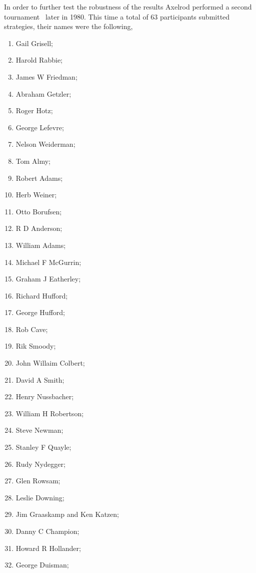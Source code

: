 \documentclass{article}
\theoremstyle{definition}
\begin{document}
In order to further test the robustness of the results Axelrod performed a second
tournament~\cite{Axelrod1980b} later in 1980. This time a total of 63 participants
submitted strategies, their names were the following,

\begin{multicols}{3}
    \begin{enumerate}
        \item Gail Grisell;
        \item Harold Rabbie;
        \item James W Friedman;
        \item Abraham Getzler;
        \item Roger Hotz;
        \item George Lefevre;
        \item Nelson Weiderman;
        \item Tom Almy;
        \item Robert Adams;
        \item Herb Weiner;
        \item Otto Borufsen;
        \item R D Anderson;
        \item William Adams;
        \item Michael F McGurrin;
        \item Graham J Eatherley;
        \item Richard Hufford;
        \item George Hufford;
        \item Rob Cave;
        \item Rik Smoody;
        \item John Willaim Colbert;
        \item David A Smith;
        \item Henry Nussbacher;
        \item William H Robertson;
        \item Steve Newman;
        \item Stanley F Quayle;
        \item Rudy Nydegger;
        \item Glen Rowsam;
        \item Leslie Downing;
        \item Jim Graaskamp and Ken Katzen;
        \item Danny C Champion;
        \item Howard R Hollander;
        \item George Duisman;

\end{enumerate}
\end{multicols}
\end{document}
